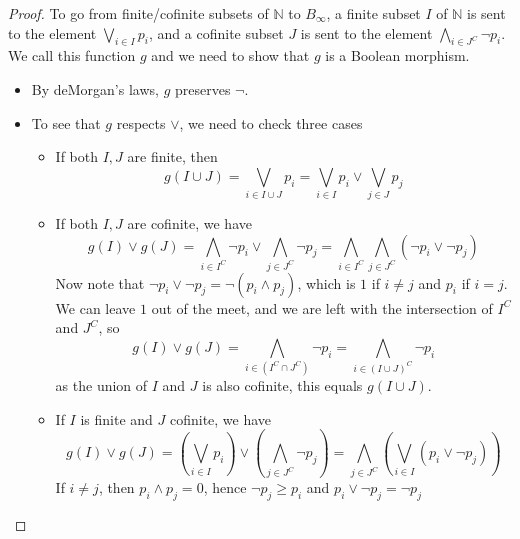 \begin{proof}
  To go from finite/cofinite subsets of $\mathbb N$ to $B_\infty$,
  a finite subset $I$ of $\mathbb N$ is sent to the element 
  $\bigvee_{i \in I} p_i$, and a cofinite subset $J$ is sent to the element 
  $\bigwedge_{i \in J^C} \neg p_i$.  
  We call this function $g$ and we need to show that $g$ is a Boolean morphism. 
  \begin{itemize}
    \item By deMorgan's laws, $g$ preserves $\neg$. 
    \item To see that $g$ respects $\vee$, we need to check three cases
      \begin{itemize}
        \item If both $I,J$ are finite, then 
        \begin{equation} 
          g(I \cup J) = \bigvee_{i\in I \cup J} p_i= \bigvee_{i\in I} p_i \vee \bigvee_{j\in J} p_j 
        \end{equation}
      \item If both $I,J$ are cofinite, we have
        \begin{equation}
          g(I) \vee g(J) = 
          \bigwedge_{i \in I^C} \neg p_i \vee 
          \bigwedge_{j \in J^C} \neg p_j 
          = 
          \bigwedge_{i\in I^C} 
          \bigwedge_{j \in J^C}(\neg p_i \vee  \neg p_j) 
        \end{equation}
        Now note that $\neg p_i \vee \neg p_j = \neg ( p_i \wedge p_j)$, which 
        is $1$ if $i \neq j$ and $p_i$ if $i =j$. 
        We can leave $1$ out of the meet, and we are left with the intersection of $I^C$ and $J^C$, so
        \begin{equation}
          g(I) \vee g(J) = 
          \bigwedge_{i \in (I^C \cap J^C)} \neg p_i
          = 
          \bigwedge_{i \in (I \cup J)^C} \neg p_i 
        \end{equation} 
        as the union of $I$ and $J$ is also cofinite, this equals 
          $ g( I \cup J)$. 
        \item If $I$ is finite and $J$ cofinite, we have 
        \begin{equation}
        g(I) \vee g(J) = (\bigvee_{i\in I} p_i) \vee (\bigwedge_{j \in J^C} \neg p_j)
        = \bigwedge_{j \in J^C} (\bigvee_{i \in I}( p_i \vee \neg p_j))
        \end{equation}
        If $i\neq j$, then $p_i\wedge p_j = 0$, hence $\neg p_j \geq p_i$ and $p_i \vee \neg p_j  = \neg p_j$

\end{itemize}
\end{itemize}
\end{proof}
